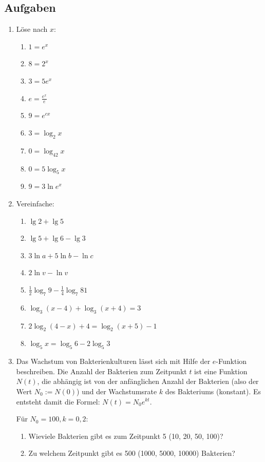 \subsection{Aufgaben}
\begin{enumerate}
 \item Löse nach $x$:
\begin{multicols}{3}
\begin{enumerate}
 \item $1 = e^x$
 \item $8 = 2^x$
 \item $3= 5e^x$
 \item $e = \frac{e^x}{e}$
 \item $9 = e^{cx}$
 \item $3 = \log_2 x$
 \item $0 = \log_{42} x$
 \item $0 = 5\log_5 x$
 \item $9 = 3\ln e^x$
\end{enumerate}
\end{multicols}

  \item Vereinfache:
  \begin{multicols}{2}
   \begin{enumerate}
    \item $\lg 2 +\lg 5$
    \item $\lg 5 +\lg 6 -\lg 3$
    \item $3\ln a +5\ln b -\ln c$
    \item $2\ln v - \ln v$
    \item $\frac{1}{2}\log_7 9 - \frac{1}{4}\log_7 81$
    \item $\log_3(x-4) + \log_3(x+4) = 3$
    \item $2 \log_2(4-x) + 4 = \log_2(x+5) - 1$ %
    \item $\log_5 x = \log_5 6 - 2  \log_5 3$ %
   \end{enumerate}
  \end{multicols}

  \item Das Wachstum von Bakterienkulturen lässt sich mit Hilfe der
$e$-Funktion beschreiben. Die Anzahl der Bakterien zum Zeitpunkt $t$ ist eine
Funktion $N(t)$, die abhängig ist von der anfänglichen Anzahl der Bakterien
(also der Wert $N_0 := N(0)$) und der Wachstumsrate $k$ des Bakteriums
(konstant). Es entsteht damit die Formel:
$N(t) = N_0e^{kt}$.

Für $N_0 = 100, k= 0,2$:
\begin{enumerate}
 \item Wieviele Bakterien gibt es zum Zeitpunkt 5 (10, 20, 50, 100)?
 \item Zu welchem Zeitpunkt gibt es 500 (1000, 5000, 10000) Bakterien?
\end{enumerate}


\end{enumerate}
